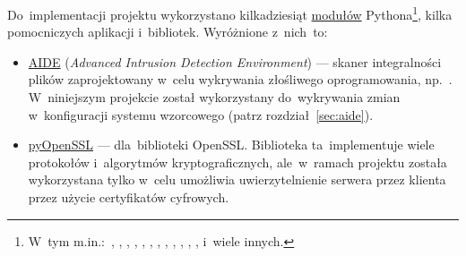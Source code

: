 \documentclass[thesis]{subfiles}
\begin{document}
Do~implementacji projektu wykorzystano kilkadziesiąt \href{https://docs.python.org/dev/tutorial/modules.html}{modułów} Pythona\footnote{W~tym m.in.:~, , , , , , , , , , , ,  i~wiele innych.}, kilka pomocniczych aplikacji i~bibliotek. Wyróżnione z~nich~to:\mynobreakpar
\begin{itemize}
	\item \href{http://aide.sourceforge.net/}{AIDE} (\emph{Advanced Intrusion Detection Environment}) --- skaner integralności plików zaprojektowany w~celu wykrywania złośliwego oprogramowania, np.~. W~niniejszym projekcie został wykorzystany do~wykrywania zmian w~konfiguracji systemu wzorcowego (patrz rozdział~\ref{sec:aide}).
	\item \href{http://www.pyopenssl.org/}{pyOpenSSL} ---  dla~biblioteki OpenSSL. Biblioteka ta~implementuje wiele protokołów i~algorytmów kryptograficznych, ale~w~ramach projektu została wykorzystana tylko w~celu umożliwia uwierzytelnienie serwera przez klienta przez użycie certyfikatów cyfrowych.
\end{itemize}
\end{document}
